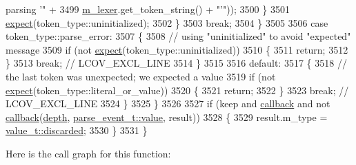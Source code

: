 \begin{DoxyCode}
{       parsing '"} +
3499                                                         \hyperlink{classnlohmann_1_1detail_1_1parser_a22dcc815551a4052b87797b34171b352}{m\_lexer}.get\_token\_string() + \textcolor{stringliteral}{"'"}));
3500                     \}
3501                     \hyperlink{classnlohmann_1_1detail_1_1parser_a9abcc7b005c70ee67ce669c398273516}{expect}(token\_type::uninitialized);
3502                 \}
3503                 \textcolor{keywordflow}{break};
3504             \}
3505 
3506             \textcolor{keywordflow}{case} token\_type::parse\_error:
3507             \{
3508                 \textcolor{comment}{// using "uninitialized" to avoid "expected" message}
3509                 \textcolor{keywordflow}{if} (not \hyperlink{classnlohmann_1_1detail_1_1parser_a9abcc7b005c70ee67ce669c398273516}{expect}(token\_type::uninitialized))
3510                 \{
3511                     \textcolor{keywordflow}{return};
3512                 \}
3513                 \textcolor{keywordflow}{break}; \textcolor{comment}{// LCOV\_EXCL\_LINE}
3514             \}
3515 
3516             \textcolor{keywordflow}{default}:
3517             \{
3518                 \textcolor{comment}{// the last token was unexpected; we expected a value}
3519                 \textcolor{keywordflow}{if} (not \hyperlink{classnlohmann_1_1detail_1_1parser_a9abcc7b005c70ee67ce669c398273516}{expect}(token\_type::literal\_or\_value))
3520                 \{
3521                     \textcolor{keywordflow}{return};
3522                 \}
3523                 \textcolor{keywordflow}{break}; \textcolor{comment}{// LCOV\_EXCL\_LINE}
3524             \}
3525         \}
3526 
3527         \textcolor{keywordflow}{if} (keep and \hyperlink{classnlohmann_1_1detail_1_1parser_a7600d272ec605e3ffdc8512b3585f476}{callback} and not \hyperlink{classnlohmann_1_1detail_1_1parser_a7600d272ec605e3ffdc8512b3585f476}{callback}(\hyperlink{classnlohmann_1_1detail_1_1parser_a49dca6af052e9cab3a48dc1eaa163063}{depth}, 
      \hyperlink{classnlohmann_1_1detail_1_1parser_a37ac88c864dda495f72cb62776b0bebea2063c1608d6e0baf80249c42e2be5804}{parse\_event\_t::value}, result))
3528         \{
3529             result.m\_type = \hyperlink{namespacenlohmann_1_1detail_a1ed8fc6239da25abcaf681d30ace4985a94708897ec9db8647dfe695714c98e46}{value\_t::discarded};
3530         \}
3531     \}
\end{DoxyCode}
Here is the call graph for this function\+:
\mbox{\label{classnlohmann_1_1detail_1_1parser_a9ff5745f2ba313e795d6568bae6dddb8}} 
